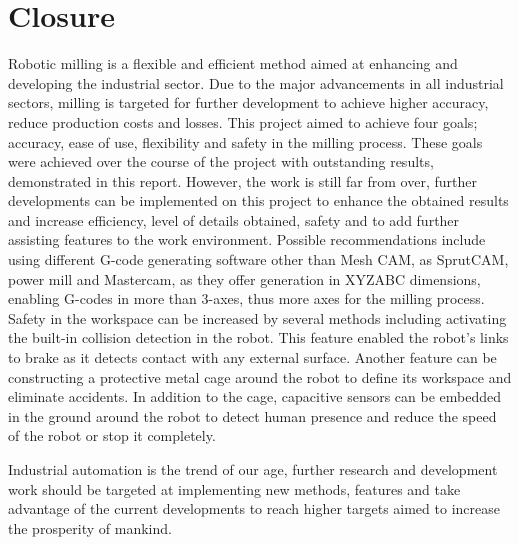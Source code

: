 \section*{Closure}
\bigskip			

Robotic milling is a flexible and efficient method aimed at enhancing and developing the industrial sector. Due to the major advancements in all industrial sectors, milling is targeted for further development to achieve higher accuracy, reduce production costs and losses. This project aimed to achieve four goals; accuracy, ease of use, flexibility and safety in the milling process. These goals were achieved over the course of the project with outstanding results, demonstrated in this report. 
\medskip			
However, the work is still far from over, further developments can be implemented on this project to enhance the obtained results and increase efficiency, level of details obtained, safety and to add further assisting features to the work environment. 
Possible recommendations include using different G-code generating software other than Mesh CAM, as SprutCAM, power mill and Mastercam, as they offer generation in XYZABC dimensions, enabling G-codes in more than 3-axes, thus more axes for the milling process. Safety in the workspace can be increased by several methods including activating the built-in collision detection in the robot. This feature enabled the robot’s links to brake as it detects contact with any external surface. Another feature can be constructing a protective metal cage around the robot to define its workspace and eliminate accidents. In addition to the cage, capacitive sensors can be embedded in the ground around the robot to detect human presence and reduce the speed of the robot or stop it completely.


\medskip Industrial automation is the trend of our age, further research and development work should be targeted at implementing new methods, features and take advantage of the current developments to reach higher targets aimed to increase the prosperity of mankind.